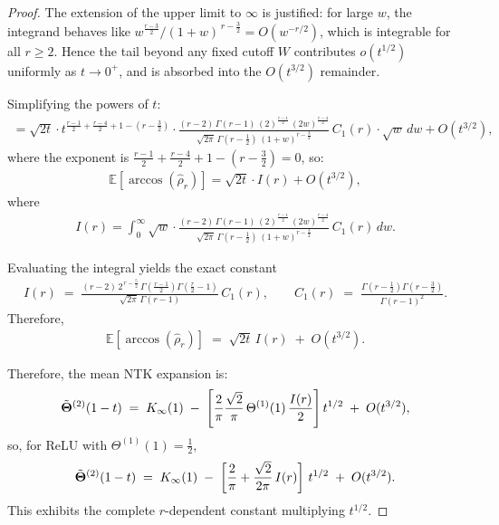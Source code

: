 \begin{proof}
The extension of the upper limit to \( \infty \) is justified: for large \( w \),
the integrand behaves like \( w^{\frac{r-3}{2}}/(1+w)^{\,r-\frac{3}{2}} = O(w^{-r/2}) \),
which is integrable for all \( r\ge 2 \). Hence the tail beyond any fixed cutoff \( W \) contributes \( o(t^{1/2}) \) uniformly as \( t\to 0^+ \),
and is absorbed into the \( O(t^{3/2}) \) remainder.

Simplifying the powers of \( t \):
\begin{align}
= \sqrt{2t} \cdot t^{\frac{r-1}{2} + \frac{r-4}{2} + 1 - (r-\frac{3}{2})} \cdot \frac{(r-2)\,\Gamma(r-1)\,(2)^{\frac{r-1}{2}}\,(2w)^{\frac{r-4}{2}}}{\sqrt{2\pi}\,\Gamma(r-\tfrac{1}{2})\,(1+w)^{r-\frac{3}{2}}}\,C_1(r) \cdot \sqrt{w} \, dw + O(t^{3/2}),
\end{align}
where the exponent is \( \frac{r-1}{2} + \frac{r-4}{2} + 1 - (r-\frac{3}{2}) = 0 \), so:
\begin{align}
\mathbb{E}[\arccos(\hat{\rho}_r)] = \sqrt{2t} \cdot I(r) + O(t^{3/2}),
\end{align}
where
\begin{align}
I(r) = \int_{0}^{\infty} \sqrt{w} \cdot \frac{(r-2)\,\Gamma(r-1)\,(2)^{\frac{r-1}{2}}\,(2w)^{\frac{r-4}{2}}}{\sqrt{2\pi}\,\Gamma(r-\tfrac{1}{2})\,(1+w)^{r-\frac{3}{2}}}\,C_1(r) \, dw.
\end{align}

Evaluating the integral yields the exact constant
\begin{align}
I(r) \;=\; \frac{(r-2)\,2^{\,r-\frac{5}{2}}\,\Gamma\!\left(\frac{r-1}{2}\right)\Gamma\!\left(\frac{r}{2}-1\right)}{\sqrt{2\pi}\,\Gamma(r-1)}\,C_1(r),
\qquad
C_1(r) \;=\; \frac{\Gamma\!\left(r-\tfrac{1}{2}\right)\Gamma\!\left(r-\tfrac{3}{2}\right)}{\Gamma(r-1)^2}.
\end{align}
Therefore,
\begin{align}
\mathbb{E}[\arccos(\hat{\rho}_r)] \;=\; \sqrt{2t}\,I(r) \;+\; O(t^{3/2}).
\end{align}

Therefore, the mean NTK expansion is:
\begin{align}
\tilde{\boldsymbol{\Theta}}^{(2)}(1-t)
\;=\;
K_\infty(1)
\;-\;
\Bigg[
\frac{2}{\pi}
\frac{\sqrt{2}}{\pi}\,\Theta^{(1)}(1)\,\frac{I(r)}{2}
\Bigg]\,t^{1/2}
\;+\; O(t^{3/2}),
\end{align}
so, for ReLU with \( \Theta^{(1)}(1)=\tfrac{1}{2} \),
\begin{align}
\tilde{\boldsymbol{\Theta}}^{(2)}(1-t)
\;=\;
K_\infty(1)
\;-\;
\left[\frac{2}{\pi} + \frac{\sqrt{2}}{2\pi}\,I(r)\right]\,t^{1/2}
\;+\; O(t^{3/2}).
\end{align}
This exhibits the complete \( r \)-dependent constant multiplying \( t^{1/2} \).


\end{proof}
